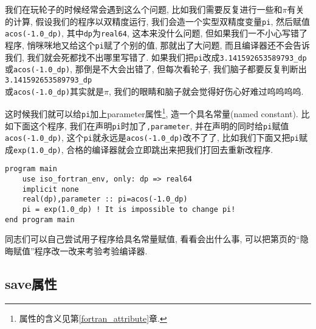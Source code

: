我们在玩轮子的时候经常会遇到这么个问题, 比如我们需要反复进行一些和$\pi$有关的计算, 假设我们的程序以双精度运行, 我们会造一个实型双精度变量\texttt{pi}, 然后赋值\texttt{acos(-1.0\_{}dp)}, 其中\texttt{dp}为\texttt{real64}, 这本来没什么问题, 但如果我们一不小心写错了程序, 悄咪咪地又给这个\texttt{pi}赋了个别的值, 那就出了大问题, 而且编译器还不会告诉我们, 我们就会死都找不出哪里写错了. 如果我们把\texttt{pi}改成\texttt{3.141592653589793\_{}dp}或\texttt{acos(-1.0\_{}dp)}, 那倒是不大会出错了, 但每次看轮子, 我们脑子都要反复判断出\texttt{3.141592653589793\_{}dp}\\或\texttt{acos(-1.0\_{}dp)}其实就是$\pi$, 我们的眼睛和脑子就会觉得好伤心好难过呜呜呜呜.

这时候我们就可以给\texttt{pi}加上parameter属性\footnote{属性的含义见第\ref{fortran_attribute}章.}, 造一个具名常量(named constant). 比如下面这个程序, 我们在声明\texttt{pi}时加了\texttt{,parameter}, 并在声明的同时给\texttt{pi}赋值\texttt{acos(-1.0\_{}dp)}, 这个\texttt{pi}就永远是\texttt{acos(-1.0\_{}dp)}改不了了, 比如我们下面又把\texttt{pi}赋成\texttt{exp(1.0\_{}dp)}, 合格的编译器就会立即跳出来把我们打回去重新改程序.
\begin{lstlisting}
program main
    use iso_fortran_env, only: dp => real64
    implicit none
    real(dp),parameter :: pi=acos(-1.0_dp)
    pi = exp(1.0_dp) ! It is impossible to change pi!
end program main
\end{lstlisting}
同志们可以自己尝试用子程序给具名常量赋值, 看看会出什么事, 可以把第\pageref{secret_assignment}页的``隐晦赋值''程序改一改来考验考验编译器.

\subsection{save属性}

